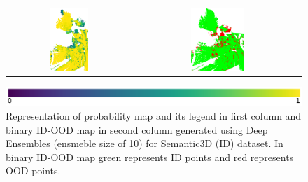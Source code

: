 \begin{figure}[h!]
\begin{tabular}{cc}
            \includegraphics[width=0.33\textwidth, height=0.18\textheight]{images/ood_imgs/de_sem3d/de_prob_10_3.pdf}& 
            \includegraphics[width=0.33\textwidth, height=0.18\textheight]{images/ood_imgs/de_sem3d/de_ood_auroc_3.pdf}\\
        \end{tabular}
        \includegraphics[scale=0.45]{images/prob_legend.pdf}
        \caption{Representation of probability map and its legend in first column and binary ID-OOD map in second column generated using Deep Ensembles (ensmeble size of 10) for Semantic3D (ID) dataset. In binary ID-OOD map green represents ID points and red represents OOD points.}
        \label{fig:de_ood_auroc_sem3d_prob}
    \end{figure}

